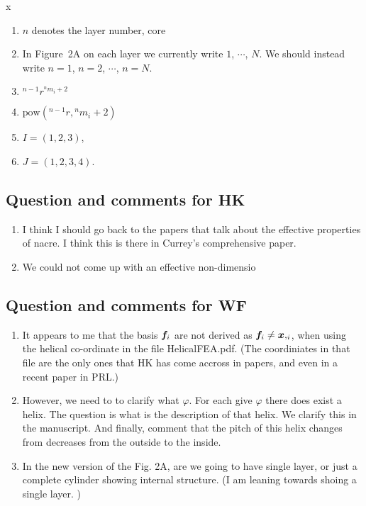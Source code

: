 \documentclass[10pt,times]{article}
\begin{document}
x

\begin{enumerate}
    \item $n$ denotes the layer number, core
    \item In Figure~2A on each layer we currently write  $1$, $\cdots$, $N$. We should instead write $n=1$, $n=2$,  $\cdots$, $n=N$. 
    \item $^{n-1}\!{r}^{{}^{n}\!{m_{i}}+2}$
    \item $\text{pow}(^{n-1}\!{r},{{}^{n}\!{m_{i}}+2})$
    \item $I=(1,2,3)$, 
    \item $J=(1,2,3,4)$. 
\end{enumerate}

\subsection{Question and comments for HK}
\begin{enumerate}
    \item I think I should go back to the papers that talk about the effective properties of nacre. I think this is there in Currey's comprehensive paper.
    \item We could not come up with an effective non-dimensio
\end{enumerate}

\subsection{Question and comments for WF}
\begin{enumerate}
    \item It appears to me that the basis $\boldsymbol{f}_i$ are not derived as $\boldsymbol{f}_i \neq \boldsymbol{x},_{i} $, when using the helical co-ordinate in the file HelicalFEA.pdf. (The coordiniates in that file are the only ones that HK has come accross in papers, and even in a recent paper in PRL.)
    \item However, we need to to clarify what $\varphi$. For each give $\varphi$ there does exist a helix. The question is what is the description of that helix. We clarify this in the manuscript. And finally, comment that the pitch of this helix changes from decreases from the outside to the inside.
    \item In the new version of the Fig. 2A, are we going to have single layer, or just a complete cylinder showing internal structure. (I am leaning towards shoing a single layer. ) 
\end{enumerate}
\end{document}
